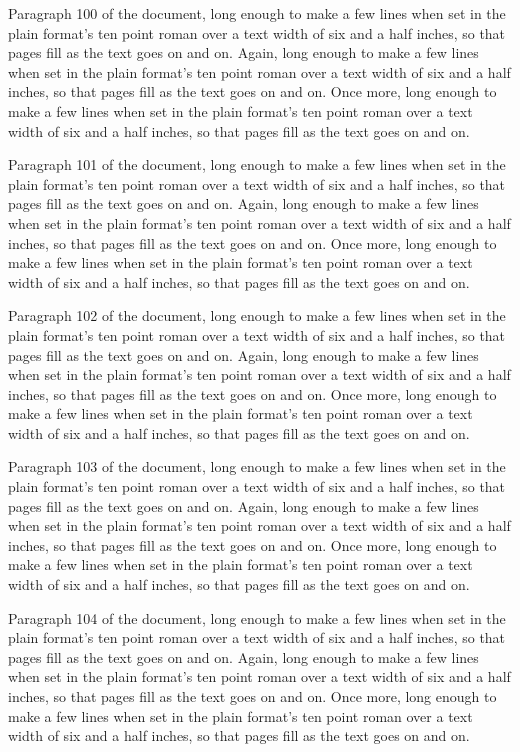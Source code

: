 Paragraph 100 of the document, long enough to make a few lines when set in the plain format's ten point roman over a text width of six and a half inches, so that pages fill as the text goes on and on. Again, long enough to make a few lines when set in the plain format's ten point roman over a text width of six and a half inches, so that pages fill as the text goes on and on. Once more, long enough to make a few lines when set in the plain format's ten point roman over a text width of six and a half inches, so that pages fill as the text goes on and on.

Paragraph 101 of the document, long enough to make a few lines when set in the plain format's ten point roman over a text width of six and a half inches, so that pages fill as the text goes on and on. Again, long enough to make a few lines when set in the plain format's ten point roman over a text width of six and a half inches, so that pages fill as the text goes on and on. Once more, long enough to make a few lines when set in the plain format's ten point roman over a text width of six and a half inches, so that pages fill as the text goes on and on.

Paragraph 102 of the document, long enough to make a few lines when set in the plain format's ten point roman over a text width of six and a half inches, so that pages fill as the text goes on and on. Again, long enough to make a few lines when set in the plain format's ten point roman over a text width of six and a half inches, so that pages fill as the text goes on and on. Once more, long enough to make a few lines when set in the plain format's ten point roman over a text width of six and a half inches, so that pages fill as the text goes on and on.

Paragraph 103 of the document, long enough to make a few lines when set in the plain format's ten point roman over a text width of six and a half inches, so that pages fill as the text goes on and on. Again, long enough to make a few lines when set in the plain format's ten point roman over a text width of six and a half inches, so that pages fill as the text goes on and on. Once more, long enough to make a few lines when set in the plain format's ten point roman over a text width of six and a half inches, so that pages fill as the text goes on and on.

Paragraph 104 of the document, long enough to make a few lines when set in the plain format's ten point roman over a text width of six and a half inches, so that pages fill as the text goes on and on. Again, long enough to make a few lines when set in the plain format's ten point roman over a text width of six and a half inches, so that pages fill as the text goes on and on. Once more, long enough to make a few lines when set in the plain format's ten point roman over a text width of six and a half inches, so that pages fill as the text goes on and on.

